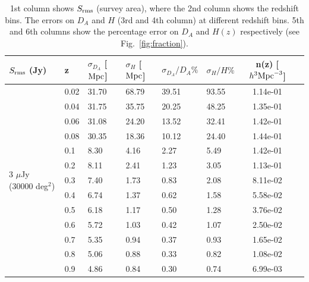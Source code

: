 \documentclass[useAMS,usenatbib]{mn2e}
\begin{document}
\begin{table}
\begin{center}
\caption{1st column shows $S_{\rm rms}$ (survey area), where the 2nd column shows the redshift bins. The errors on $D_A$ and $H$ (3rd and 4th column) at different redshift bins. 5th and 6th columns show the percentage error on $D_A$ and $H(z)$ respectively (see Fig.~\ref{fig:fraction}).} %
\begin{tabular}{l|l|l|l|l|lc||r}
\hline
\hline 
\multirow{1}{*}{ $S_{\rm rms}$ (Jy) }& z & $\sigma_{D_A} $ [${\rm Mpc}$]&  $\sigma_{H}$ [${\rm Mpc}$] & $\sigma_{D_A}/{D_A} \%$ & $\sigma_{H}/H \%$ &n(z) [$h^{3} {\rm Mpc}^{-3}$] \\
\hline
\multirow{20}{*}{3 $\mu$Jy (30000 deg$^2$)}
& 0.02 &  31.70 & 68.79 & 39.51 & 93.55 & 1.14e-01 \\
& 0.04 &  31.75 & 35.75 & 20.25 & 48.25 & 1.35e-01 \\
& 0.06 &  31.08 & 24.20 & 13.52 & 32.41 & 1.42e-01 \\
& 0.08 &  30.35 & 18.36 & 10.12 & 24.40 & 1.44e-01 \\
& 0.1 &  8.30 & 4.16 & 2.27 & 5.49 & 1.42e-01 \\
& 0.2 &  8.11 & 2.41 & 1.23 & 3.05 & 1.13e-01 \\
& 0.3 &  7.40 & 1.73 & 0.83 & 2.08 & 8.11e-02 \\
& 0.4 &  6.74 & 1.37 & 0.62 & 1.58 & 5.58e-02 \\
& 0.5 &  6.18 & 1.17 & 0.50 & 1.28 & 3.76e-02 \\
& 0.6 &  5.72 & 1.03 & 0.42 & 1.07 & 2.50e-02 \\
& 0.7 &  5.35 & 0.94 & 0.37 & 0.93 & 1.65e-02 \\
& 0.8 &  5.06 & 0.88 & 0.33 & 0.82 & 1.08e-02 \\
& 0.9 &  4.86 & 0.84 & 0.30 & 0.74 & 6.99e-03 \\

\end{tabular}
\end{center}
\end{table}
\end{document}

